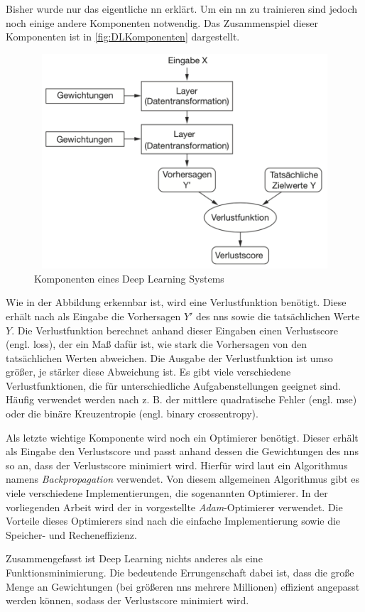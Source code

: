 Bisher wurde nur das eigentliche \acrshort{nn} erklärt.
Um ein \acrshort{nn} zu trainieren sind jedoch noch einige andere Komponenten notwendig.
Das Zusammenspiel dieser Komponenten ist in \autoref{fig:DLKomponenten} dargestellt.

\begin{figure}[h]
    \centering
    \includegraphics[width=1\textwidth,height=8cm,keepaspectratio=true]{content/images/DeepLearningKomponenten.png}
    \caption{Komponenten eines Deep Learning Systems \cite[Abb. 1.9]{DeepLearningPythonKeras}}
    \label{fig:DLKomponenten}
\end{figure}

Wie in der Abbildung erkennbar ist, wird eine Verlustfunktion benötigt.
Diese erhält nach \cite[S. 30]{DeepLearningPythonKeras} als Eingabe die Vorhersagen $Y'$ des \acrshort{nn}s sowie die tatsächlichen Werte $Y$.
Die Verlustfunktion berechnet anhand dieser Eingaben einen Verlustscore (engl. loss), der ein Maß dafür ist, wie stark die Vorhersagen von den tatsächlichen Werten abweichen.
Die Ausgabe der Verlustfunktion ist umso größer, je stärker diese Abweichung ist.
Es gibt viele verschiedene Verlustfunktionen, die für unterschiedliche Aufgabenstellungen geeignet sind.
Häufig verwendet werden nach \cite[S. 155]{DeepLearningPythonKeras} z. B. der mittlere quadratische Fehler (engl. \acrfull{mse}) oder die binäre Kreuzentropie (engl. binary crossentropy).

Als letzte wichtige Komponente wird noch ein Optimierer benötigt.
Dieser erhält als Eingabe den Verlustscore und passt anhand dessen die Gewichtungen des \acrshort{nn}s so an, dass der Verlustscore minimiert wird.
Hierfür wird laut \cite[S. 30]{DeepLearningPythonKeras} ein Algorithmus namens \emph{Backpropagation} verwendet.
Von diesem allgemeinen Algorithmus gibt es viele verschiedene Implementierungen, die sogenannten Optimierer.
In der vorliegenden Arbeit wird der in \cite{AdamPaper} vorgestellte \emph{Adam}-Optimierer verwendet.
Die Vorteile dieses Optimierers sind nach \cite{AdamPaper} die einfache Implementierung sowie die Speicher- und Recheneffizienz.

Zusammengefasst ist Deep Learning nichts anderes als eine Funktionsminimierung.
Die bedeutende Errungenschaft dabei ist, dass die große Menge an Gewichtungen (bei größeren \acrshort{nn}s mehrere Millionen) effizient angepasst werden können, sodass der Verlustscore minimiert wird.

